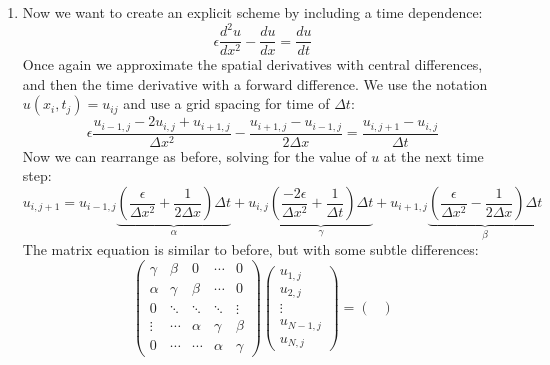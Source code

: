 \documentclass[11pt]{article}
\begin{document}
\begin{enumerate}
\begin{enumerate}
        \item Now we want to create an explicit scheme by including a time dependence:
        \begin{equation}
            \epsilon\frac{d^2u}{dx^2}-\frac{du}{dx}=\frac{du}{dt}
            \label{eqn:time-dep}
        \end{equation}
        Once again we approximate the spatial derivatives with central differences, and then the time derivative with a forward difference. We use the notation $u(x_i, t_j)=u_{ij}$ and use a grid spacing for time of $\Delta t$:
        \begin{equation*}
            \epsilon\frac{u_{i-1,j}-2u_{i,j}+u_{i+1,j}}{\Delta x^2}-\frac{u_{i+1,j}-u_{i-1,j}}{2\Delta x}=\frac{u_{i,j+1}-u_{i,j}}{\Delta t}
        \end{equation*}
        Now we can rearrange as before, solving for the value of $u$ at the next time step:
        \begin{equation*}
            u_{i,j+1}=u_{i-1,j}\underbrace{\left(\frac{\epsilon}{\Delta x^2}+\frac{1}{2\Delta x}\right)\Delta t}_\alpha + u_{i,j}\underbrace{\left(\frac{-2\epsilon}{\Delta x^2}+\frac{1}{\Delta t}\right)\Delta t}_\gamma + u_{i+1,j}\underbrace{\left(\frac{\epsilon}{\Delta x^2}-\frac{1}{2\Delta x}\right)\Delta t}_\beta
        \end{equation*}
        The matrix equation is similar to before, but with some subtle differences:
        \begin{equation*}
            \begin{pmatrix}
                \gamma & \beta & 0 & \cdots & 0 \\
                \alpha & \gamma & \beta & \cdots & 0 \\
                0 & \ddots & \ddots & \ddots & \vdots \\
                \vdots & \cdots & \alpha & \gamma & \beta \\
                0 & \cdots & \cdots & \alpha & \gamma
            \end{pmatrix}
            \begin{pmatrix}
                u_{1,j} \\
                u_{2,j} \\
                \vdots \\
                u_{N-1,j} \\
                u_{N,j}
            \end{pmatrix}
            =
            \begin{pmatrix}

\end{pmatrix}
\end{equation*}
\end{enumerate}
\end{enumerate}
\end{document}
